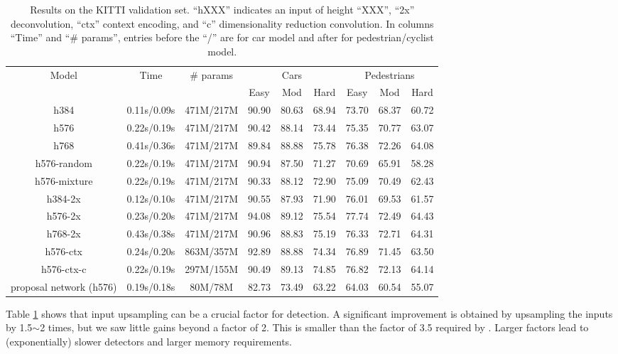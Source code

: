 \documentclass[runningheads]{llncs}
\begin{document}
\begin{table}[t]
\centering \scriptsize \setlength{\tabcolsep}{2.5pt}
\caption{Results on the KITTI validation set. ``hXXX'' indicates an input
of height ``XXX'', ``2x'' deconvolution, ``ctx'' context encoding, and ``c'' dimensionality reduction convolution.  In columns ``Time'' and ``\# params'', entries before the ``/'' are for car model and after for pedestrian/cyclist model.}
\label{tab:model comparison}
\begin{tabular}
{c||c||c||ccc|ccc}\hline\hline
\multirow{2}{*}{Model}
&\multirow{2}{*}{Time}
&\multirow{2}{*}{\# params}
&\multicolumn{3}{|c|}{Cars}
&\multicolumn{3}{|c}{Pedestrians}\\
\cline{4-9}
&\multicolumn{1}{|c||}{} &\multicolumn{1}{|c||}{} & Easy & Mod & Hard & Easy & Mod & Hard \\\hline
h384 &0.11s/0.09s &471M/217M          &90.90 &80.63 &68.94 &73.70 &68.37 &60.72\\
h576 &0.22s/0.19s &471M/217M          &90.42 &88.14 &73.44 &75.35 &70.77 &63.07\\
h768 &0.41s/0.36s &471M/217M          &89.84 &88.88 &75.78 &76.38 &72.26 &64.08\\\hline
h576-random &0.22s/0.19s &471M/217M   &90.94 &87.50 &71.27 &70.69 &65.91 &58.28\\
h576-mixture &0.22s/0.19s &471M/217M  &90.33 &88.12 &72.90 &75.09 &70.49 &62.43\\\hline
h384-2x &0.12s/0.10s &471M/217M       &90.55 &87.93 &71.90 &76.01 &69.53 &61.57\\
h576-2x &0.23s/0.20s &471M/217M       &94.08 &89.12 &75.54 &77.74 &72.49 &64.43\\
h768-2x &0.43s/0.38s &471M/217M       &90.96 &88.83 &75.19 &76.33 &72.71 &64.31\\\hline
h576-ctx &0.24s/0.20s &863M/357M      &92.89 &88.88 &74.34 &76.89 &71.45 &63.50\\
h576-ctx-c &0.22s/0.19s &297M/155M    &90.49 &89.13 &74.85 &76.82 &72.13 &64.14\\\hline
proposal network (h576) &0.19s/0.18s &80M/78M    &82.73 &73.49 &63.22 &64.03 &60.54 &55.07\\\hline
\end{tabular}
\end{table}

Table \ref{tab:model comparison} shows that input upsampling can be a crucial factor for detection. A significant improvement is obtained by upsampling the inputs by 1.5$\sim$2 times, but we saw little gains beyond a factor of 2. This is smaller than the factor of 3.5 required by
\cite{DBLP:conf/nips/XiaozhiNIPS15}. Larger factors lead to (exponentially)
slower detectors and larger memory requirements.
\end{document}
